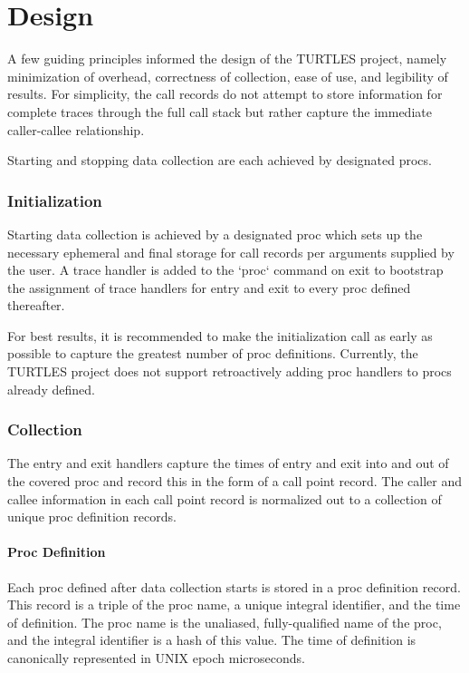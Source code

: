 \documentclass{article}[letter,10pt]
\begin{document}
\section{Design}{
  A few guiding principles informed the design of the TURTLES project, namely
  minimization of overhead, correctness of collection, ease of use, and legibility
  of results. For simplicity, the call records do not attempt to store information
  for complete traces through the full call stack but rather capture the immediate
  caller-callee relationship.

  Starting and stopping data collection are each achieved by designated procs.

  \subsubsection{Initialization}{
    Starting data collection is achieved by a designated proc which sets up
    the necessary ephemeral and final storage for call records per arguments
    supplied by the user. A trace handler is added to the `proc` command on exit
    to bootstrap the assignment of trace handlers for entry and exit to every
    proc defined thereafter.

    For best results, it is recommended to make the initialization call as early
    as possible to capture the greatest number of proc definitions. Currently,
    the TURTLES project does not support retroactively adding proc handlers
    to procs already defined.

  }
  \subsubsection{Collection}{
    The entry and exit handlers capture the times of entry and exit into and out of
    the covered proc and record this in the form of a call point record. The caller
    and callee information in each call point record is normalized out to a collection
    of unique proc definition records.

    \paragraph{Proc Definition}{
      Each proc defined after data collection starts is stored in a proc definition
      record. This record is a triple of the proc name, a unique integral identifier,
      and the time of definition. The proc name is the unaliased, fully-qualified
      name of the proc, and the integral identifier is a hash of this value.
      The time of definition is canonically represented in UNIX epoch microseconds.
    }
}}
\end{document}
